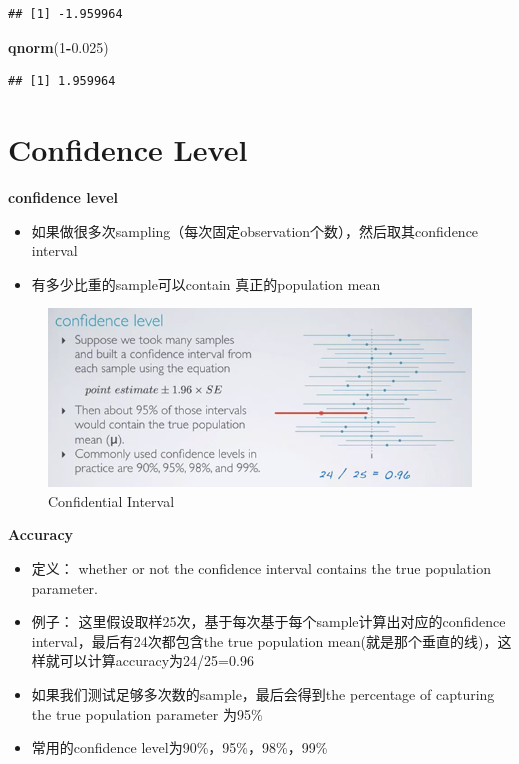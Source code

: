 \documentclass[]{book}
\newenvironment{Shaded}{\begin{snugshade}}{\end{snugshade}}
\newcommand{\KeywordTok}[1]{\textcolor[rgb]{0.13,0.29,0.53}{\textbf{#1}}}
\newcommand{\DecValTok}[1]{\textcolor[rgb]{0.00,0.00,0.81}{#1}}
\newcommand{\FloatTok}[1]{\textcolor[rgb]{0.00,0.00,0.81}{#1}}
\newcommand{\OperatorTok}[1]{\textcolor[rgb]{0.81,0.36,0.00}{\textbf{#1}}}
\newcommand{\NormalTok}[1]{#1}
\providecommand{\tightlist}{%
  \setlength{\itemsep}{0pt}\setlength{\parskip}{0pt}}
\begin{document}
\begin{verbatim}
## [1] -1.959964
\end{verbatim}

\begin{Shaded}
\begin{Highlighting}[]
\KeywordTok{qnorm}\NormalTok{(}\DecValTok{1}\OperatorTok{-}\FloatTok{0.025}\NormalTok{)}
\end{Highlighting}
\end{Shaded}

\begin{verbatim}
## [1] 1.959964
\end{verbatim}

\section{Confidence Level}\label{confidence-level}

\textbf{confidence level}

\begin{itemize}
\tightlist
\item
  如果做很多次sampling（每次固定observation个数），然后取其confidence
  interval
\item
  有多少比重的sample可以contain 真正的population mean
\end{itemize}

\begin{figure}

{\centering \includegraphics[width=0.8\linewidth]{graphs/2-8} 

}

\caption{Confidential Interval}\label{fig:fig2-8}
\end{figure}

\textbf{Accuracy}

\begin{itemize}
\tightlist
\item
  定义： whether or not the confidence interval contains the true
  population parameter.
\item
  例子： 这里假设取样25次，基于每次基于每个sample计算出对应的confidence
  interval，最后有24次都包含the true population
  mean(就是那个垂直的线)，这样就可以计算accuracy为24/25=0.96
\item
  如果我们测试足够多次数的sample，最后会得到the percentage of capturing
  the true population parameter 为95\%
\item
  常用的confidence level为90\%，95\%，98\%，99\%
\end{itemize}
\end{document}
